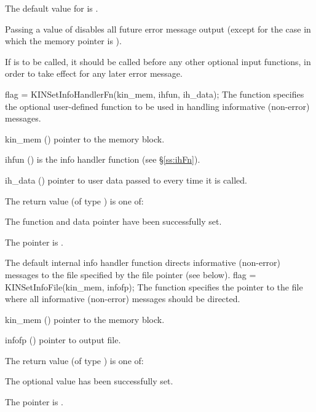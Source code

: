 {
  The default value for  is . 

  Passing a value of  disables all future error message output
  (except for the case in which the {\kinsol} memory pointer is ).

  {\warn}If  is to be called, it should be called before any
  other optional input functions, in order to take effect for any later error message.
}
{
flag = KINSetInfoHandlerFn(kin\_mem, ihfun, ih\_data);
}
{
  The function  specifies the optional user-defined function
  to be used in handling informative (non-error) messages.
}
{
  \begin{args}
  \item[kin\_mem] ()
    pointer to the {\kinsol} memory block.
  \item[ihfun] ()
    is the {\C} info handler function (see \S\ref{ss:ihFn}).
  \item[ih\_data] ()
    pointer to user data passed to  every time it is called.
  \end{args}
}
{
  The return value  (of type ) is one of:
  \begin{args}
  \item[\Id{KIN\_SUCCESS}] 
    The function  and data pointer  have been successfully set.
  \item[\Id{KIN\_MEM\_NULL}]
    The  pointer is .
  \end{args}
}
{
  The default internal info handler function directs informative (non-error) messages to the
  file specified by the file pointer  (see  below).
}
{
flag = KINSetInfoFile(kin\_mem, infofp);
}
{
  The function  specifies the pointer to the file
  where all informative (non-error) messages should be directed.
}
{
  \begin{args}
  \item[kin\_mem] ()
    pointer to the {\kinsol} memory block.
  \item[infofp] ()
    pointer to output file.
  \end{args}
}
{
  The return value  (of type ) is one of:
  \begin{args}
  \item[\Id{KIN\_SUCCESS}] 
    The optional value has been successfully set.
  \item[\Id{KIN\_MEM\_NULL}]
    The  pointer is .
  \end{args}
}
